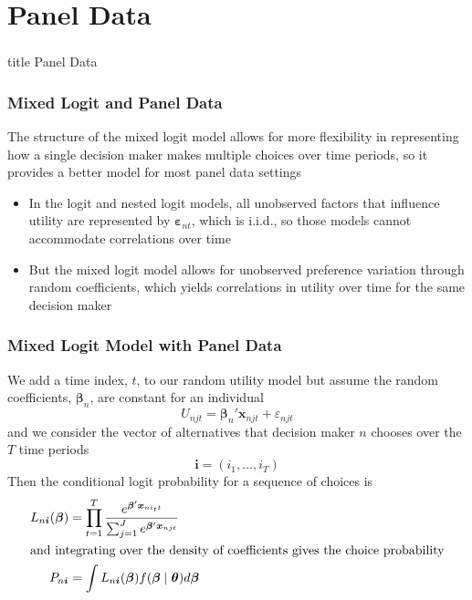 \documentclass{beamer}\usepackage[]{graphicx}\usepackage[]{color}
\begin{document}
\section{Panel Data}
\label{panel}
\begin{frame}\frametitle{}
    \vfill
    \centering
    \begin{beamercolorbox}[center]{title}
        \Large Panel Data
    \end{beamercolorbox}
    \vfill
\end{frame}

\begin{frame}\frametitle{Mixed Logit and Panel Data}
    The structure of the mixed logit model allows for more flexibility in representing how a single decision maker makes multiple choices over time periods, so it provides a better model for most panel data settings
    \begin{itemize}
        \item In the logit and nested logit models, all unobserved factors that influence utility are represented by $\bm{\varepsilon}_{nt}$, which is i.i.d., so those models cannot accommodate correlations over time
        \item But the mixed logit model allows for unobserved preference variation through random coefficients, which yields correlations in utility over time for the same decision maker
    \end{itemize}
\end{frame}

\begin{frame}\frametitle{Mixed Logit Model with Panel Data}
    We add a time index, $t$, to our random utility model but assume the random coefficients, $\bm{\beta}_n$, are constant for an individual
    $$U_{njt} = \bm{\beta}_n' \bm{x}_{njt} + \varepsilon_{njt}$$
    and we consider the vector of alternatives that decision maker $n$ chooses over the $T$ time periods
    $$\bm{i} = (i_1, \ldots, i_T)$$
    Then the conditional logit probability for a sequence of choices is
    \begin{align*}
        L_{n\bm{i}}(\bm{\beta}) & = \prod_{t = 1}^T \frac{e^{\bm{\beta}' \bm{x}_{ni_{t}t}}}{\sum_{j = 1}^J e^{\bm{\beta}' \bm{x}_{njt}}} \\
        \intertext{and integrating over the density of coefficients gives the choice probability}
        P_{n\bm{i}} & = \int L_{n\bm{i}}(\bm{\beta}) f(\bm{\beta} \mid \bm{\theta}) d \bm{\beta}
    \end{align*}
\end{frame}
\end{document}
